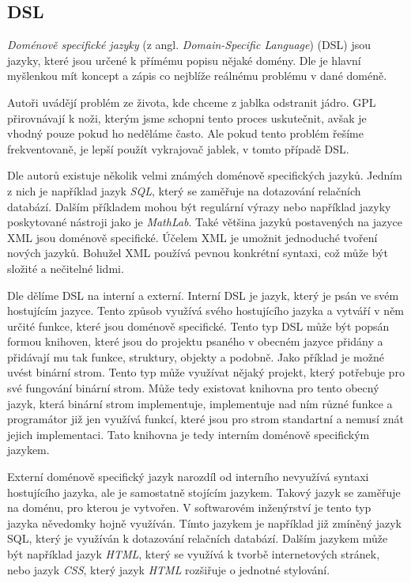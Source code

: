 \subsection{DSL}

\textit{Doménově specifické jazyky} (z angl. \textit{Domain-Specific Language}) (DSL) jsou jazyky, které jsou určené k přímému popisu nějaké domény. Dle \cite{Xtext} je hlavní myšlenkou mít koncept a zápis co nejblíže reálnému problému v dané doméně.

Autoři uvádějí problém ze života, kde chceme z jablka odstranit jádro. GPL přirovnávají k noži, kterým jsme schopni tento proces uskutečnit, avšak je vhodný pouze pokud ho neděláme často. Ale pokud tento problém řešíme frekventovaně, je lepší použít vykrajovač jablek, v tomto případě DSL. 

Dle autorů \cite{Xtext} existuje několik velmi známých doménově specifických jazyků. Jedním z nich je například jazyk \textit{SQL}, který se zaměřuje na dotazování relačních databází. Dalším příkladem mohou být regulární výrazy nebo například jazyky poskytované nástroji jako je \textit{MathLab}. Také většina jazyků postavených na jazyce XML jsou doménově specifické. Účelem XML je umožnit jednoduché tvoření nových jazyků. Bohužel XML používá pevnou konkrétní syntaxi, což může být složité a nečitelné lidmi. 

Dle \cite{Fowler} dělíme DSL na interní a externí. Interní DSL je jazyk, který je psán ve svém hostujícím jazyce. Tento způsob využívá svého hostujícího jazyka a vytváří v něm určité funkce, které jsou doménově specifické. Tento typ DSL může být popsán formou knihoven, které jsou do projektu psaného v obecném jazyce přidány a přidávají mu tak funkce, struktury, objekty a podobně. Jako příklad je možné uvést binární strom. Tento typ může využívat nějaký projekt, který potřebuje pro své fungování binární strom. Může tedy existovat knihovna pro tento obecný jazyk, která binární strom implementuje, implementuje nad ním různé funkce a programátor již jen využívá funkcí, které jsou pro strom standartní a nemusí znát jejich implementaci. Tato knihovna je tedy interním doménově specifickým jazykem.

Externí doménově specifický jazyk narozdíl od interního nevyužívá syntaxi hostujícího jazyka, ale je samostatně stojícím jazykem. Takový jazyk se zaměřuje na doménu, pro kterou je vytvořen. V softwarovém inženýrství je tento typ jazyka něvedomky hojně využíván. Tímto jazykem je například již zmíněný jazyk SQL, který je využíván k dotazování relačních databází. Dalším jazykem může být například jazyk \textit{HTML}, který se využívá k tvorbě internetových stránek, nebo jazyk \textit{CSS}, který jazyk \textit{HTML} rozšiřuje o jednotné stylování.

